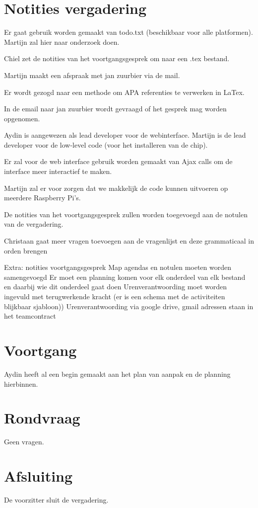 \documentclass[dutch]{hu}
\begin{document}
\section{Notities vergadering}
Er gaat gebruik worden gemaakt van todo.txt (beschikbaar voor alle platformen). Martijn zal hier naar onderzoek doen.

Chiel zet de notities van het voortgangsgesprek om naar een .tex bestand.

Martijn maakt een afspraak met jan zuurbier via de mail.

Er wordt gezogd naar een methode om APA referenties te verwerken in LaTex.

In de email naar jan zuurbier wordt gevraagd of het gesprek mag worden opgenomen.

Aydin is aangewezen als lead developer voor de webinterface.
Martijn is de lead developer voor de low-level code (voor het installeren van de chip).

Er zal voor de web interface gebruik worden gemaakt van Ajax calls om de interface meer interactief te maken.

Martijn zal er voor zorgen dat we makkelijk de code kunnen uitvoeren op meerdere Raspberry Pi's.

De notities van het voortgangsgesprek zullen worden toegevoegd aan de notulen van de vergadering.

Christaan gaat meer vragen toevoegen aan de vragenlijst en deze grammaticaal in orden brengen

Extra: notities voortgangsgesprek
Map agendas en notulen moeten worden samengevoegd
Er moet een planning komen voor elk onderdeel van elk bestand en daarbij wie dit onderdeel gaat doen
Urenverantwoording moet worden ingevuld met terugwerkende kracht (er is een schema met de activiteiten blijkbaar sjabloon))
Urenverantwoording via google drive, gmail adressen staan in het teamcontract

\section{Voortgang}
Aydin heeft al een begin gemaakt aan het plan van aanpak en de planning hierbinnen.

\section{Rondvraag}
Geen vragen.

\section{Afsluiting}
De voorzitter sluit de vergadering.
\end{document}
